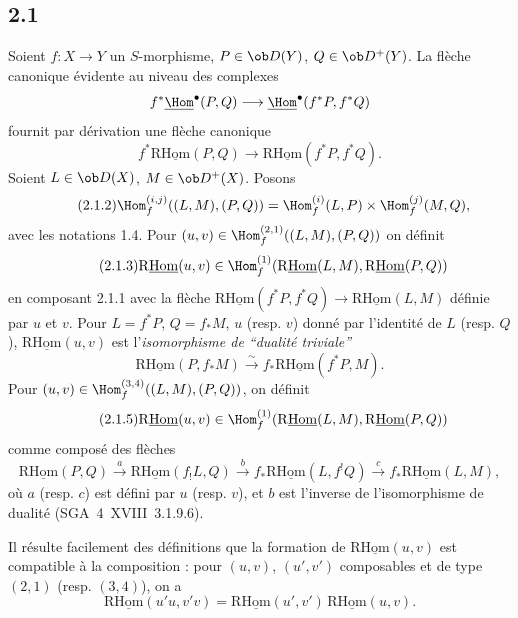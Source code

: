 \subsection*{2.1}
Soient $f:X\to Y$ un $S$-morphisme, $P\in\ob D(Y)$, $Q\in\ob D^{+}(Y)$. La flèche canonique évidente au niveau des complexes
\[
f^{*}\underline{\Hom}^{\bullet}(P,Q)\longrightarrow\underline{\Hom}^{\bullet}(f^{*}P,f^{*}Q)
\]
fournit par dérivation une flèche canonique
\begin{equation}\tag{2.1.1}
f^{*}\mathrm{R}\underline{\mathrm{Hom}}(P,Q)\longrightarrow\mathrm{R}\underline{\mathrm{Hom}}(f^{*}P,f^{*}Q).
\end{equation}
Soient $L\in\ob D(X)$, $M\in\ob D^{+}(X)$. Posons
\begin{equation}\tag{2.1.2}
\Hom_f^{(i,j)}((L,M),(P,Q))=\Hom_f^{(i)}(L,P)\times\Hom_f^{(j)}(M,Q),
\end{equation}
avec les notations 1.4. Pour $(u,v)\in\Hom_f^{(2,1)}((L,M),(P,Q))$ on définit
\begin{equation}\tag{2.1.3}
\mathrm{R}\underline{\mathrm{Hom}}(u,v)\in\Hom_f^{(1)}(\mathrm{R}\underline{\mathrm{Hom}}(L,M),\mathrm{R}\underline{\mathrm{Hom}}(P,Q))
\end{equation}
en composant 2.1.1 avec la flèche $\mathrm{R}\underline{\mathrm{Hom}}(f^{*}P,f^{*}Q)\to\mathrm{R}\underline{\mathrm{Hom}}(L,M)$ définie par $u$ et $v$. Pour $L=f^{*}P$, $Q=f_{*}M$, $u$ (resp. $v$) donné par l'identité de $L$ (resp. $Q$), $\mathrm{R}\underline{\mathrm{Hom}}(u,v)$ est l'\emph{isomorphisme de ``dualité triviale''}
\begin{equation}\tag{2.1.4}
\mathrm{R}\underline{\mathrm{Hom}}(P,f_{*}M)\xrightarrow{\sim}f_{*}\mathrm{R}\underline{\mathrm{Hom}}(f^{*}P,M).
\end{equation}
Pour $(u,v)\in\Hom_f^{(3,4)}((L,M),(P,Q))$, on définit
\begin{equation}\tag{2.1.5}
\mathrm{R}\underline{\mathrm{Hom}}(u,v)\in\Hom_f^{(1)}(\mathrm{R}\underline{\mathrm{Hom}}(L,M),\mathrm{R}\underline{\mathrm{Hom}}(P,Q))
\end{equation}
comme composé des flèches
\[
\mathrm{R}\underline{\mathrm{Hom}}(P,Q)\xrightarrow{a}\mathrm{R}\underline{\mathrm{Hom}}(f_{!}L,Q)\xrightarrow{b}f_{*}\mathrm{R}\underline{\mathrm{Hom}}(L,f^{!}Q)\xrightarrow{c}f_{*}\mathrm{R}\underline{\mathrm{Hom}}(L,M),
\]
où $a$ (resp. $c$) est défini par $u$ (resp. $v$), et $b$ est l'inverse de l'isomorphisme de dualité (SGA~4~XVIII~3.1.9.6).

Il résulte facilement des définitions que la formation de $\mathrm{R}\underline{\mathrm{Hom}}(u,v)$ est compatible à la composition : pour $(u,v)$, $(u',v')$ composables et de type $(2,1)$ (resp. $(3,4)$), on a
\begin{equation}\tag{2.1.6}
\mathrm{R}\underline{\mathrm{Hom}}(u'u,v'v)=\mathrm{R}\underline{\mathrm{Hom}}(u',v')\,\mathrm{R}\underline{\mathrm{Hom}}(u,v).
\end{equation}

